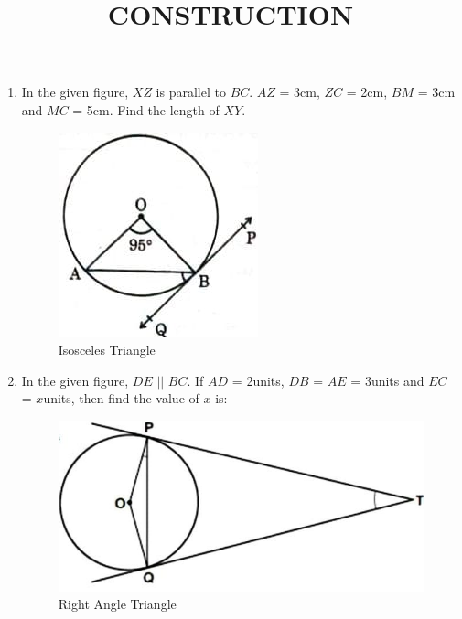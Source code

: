 \documentclass{article}
\begin{document}
\title{\textbf{CONSTRUCTION}}
\date{}
\maketitle

\begin{enumerate}
	\item In the given figure, $XZ$ is parallel to $BC$. $AZ$ = 3cm, $ZC$ = 2cm, $BM$ = 3cm and $MC$ = 5cm. Find the length of $XY$.
		\begin{figure}[h!]
			\centering
			\includegraphics [width=\columnwidth] {figs/fig1.jpg}
			\caption{Isosceles Triangle}
			\label{fig:fig1.jpg}
		\end{figure}

	\item In the given figure, $DE$ $||$ $BC$. If $AD$ = 2units, $DB$ = $AE$ = 3units and $EC$ = $x$units, then find the value of $x$ is:\\

		\begin{figure}[h!]
			\centering
			\includegraphics [width=\columnwidth] {figs/fig2.jpg}
			\caption{Right Angle Triangle}
			\label{fig:fig2.jpg}
		\end{figure}


\end{enumerate}
\end{document}
